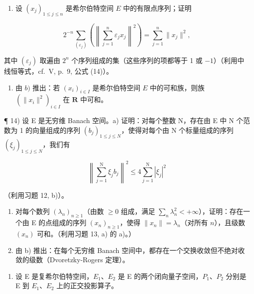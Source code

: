 \begin{enumerate}
\def\labelenumi{\alph{enumi})}
\setcounter{enumi}{1}
\tightlist
\item
  设 \((x_{j})_{1\leqslant j\leqslant n}\) 是希尔伯特空间 \(E\) 中的有限点序列；证明
\end{enumerate}

\[
2 ^ {- n} \sum_ {(\varepsilon_ {j})} \left(\left\| \sum_ {j = 1} ^ {n} \varepsilon_ {j} x _ {j} \right\| ^ {2}\right) = \sum_ {j = 1} ^ {n} \| x _ {j} \| ^ {2},
\]

其中 \((\varepsilon_{j})\) 取遍由 \(2^{n}\) 个序列组成的集（这些序列的项都等于 1 或 \(-1\)）（利用中线恒等式，cf.~V, p.~9, 公式 (14)）。

\begin{enumerate}
\def\labelenumi{\alph{enumi})}
\setcounter{enumi}{2}
\tightlist
\item
  由 \(b)\) 推出：若 \((x_{i})_{i\in I}\) 是希尔伯特空间 \(E\) 中的可和族，则族 \((\| x_i\|^2)_{i\in I}\) 在 \(\mathbf{R}\) 中可和。
\end{enumerate}

¶ 14) 设 E 是无穷维 Banach 空间。a) 证明：对每个整数 N，存在由 E 中 N 个范数为 1 的向量组成的序列 \((b_{j})_{1 \leqslant j \leqslant N}\)，使得对每个由 N 个标量组成的序列 \((\xi_{j})_{1 \leqslant j \leqslant N}\)，我们有

\[
\left\| \sum_ {j = 1} ^ {\mathrm{N}} \xi_ {j} b _ {j} \right\| ^ {2} \leqslant 4 \sum_ {j = 1} ^ {\mathrm{N}} | \xi_ {j} | ^ {2}
\]

（利用习题 12, b)）。

\begin{enumerate}
\def\labelenumi{\alph{enumi})}
\setcounter{enumi}{1}
\item
  对每个数列 \((\lambda_n)_{n\geqslant 1}\)（由数 \(\geqslant 0\) 组成，满足 \(\sum_{n}\lambda_{n}^{2} < +\infty\)），证明：存在一个由 E 的点组成的序列 \((x_{n})_{n\geqslant 1}\)，使得 \(\| x_n\| = \lambda_n\)（对所有 \(n\)），且级数 \((x_{n})\) 可和。（利用习题 13, a) 的 a)。）
\item
  由 b) 推出：在每个无穷维 Banach 空间中，都存在一个交换收敛但不绝对收敛的级数（Dvoretzky-Rogers 定理）。
\end{enumerate}

\begin{enumerate}
\def\labelenumi{\arabic{enumi})}
\setcounter{enumi}{14}
\tightlist
\item
  设 E 是复希尔伯特空间，\(E_{1}\)、\(E_{2}\) 是 E 的两个闭向量子空间，\(P_{1}\)、\(P_{2}\) 分别是 E 到 \(E_{1}\)、\(E_{2}\) 上的正交投影算子。
\end{enumerate}

